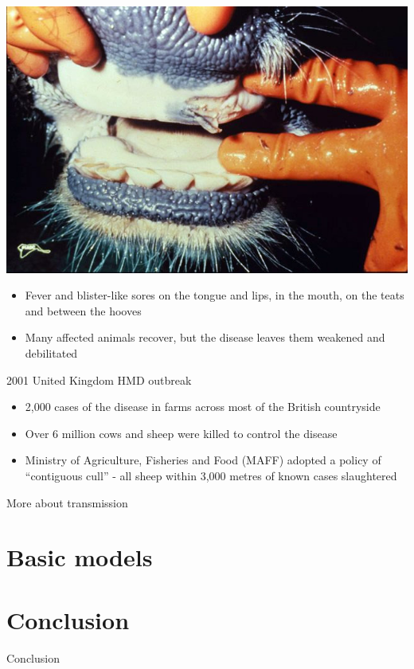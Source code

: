 \documentclass[aspectratio=43]{beamer}
\begin{document}
\begin{frame}{}
  \begin{minipage}{0.3\textwidth}
    \includegraphics[width=1.1\textwidth]{../FIGS/Foot_and_mouth_disease_in_mouth.jpg}
  \end{minipage}
  \begin{minipage}{0.65\textwidth}
    \begin{itemize}
      \item Fever and blister-like sores on the tongue and lips, in the mouth, on the teats and between the hooves
      \item Many affected animals recover, but the disease leaves them weakened and debilitated
    \end{itemize}
  \end{minipage}
\end{frame}


\begin{frame}{2001 United Kingdom HMD outbreak}
  \begin{itemize}
    \item 2,000 cases of the disease in farms across most of the British countryside
    \vfill
    \item Over 6 million cows and sheep were killed to control the disease
    \vfill
    \item Ministry of Agriculture, Fisheries and Food (MAFF) adopted a policy of ``contiguous cull'' - all sheep within 3,000 metres of known cases slaughtered
  \end{itemize}
\end{frame}

\begin{frame}{More about transmission}

\end{frame}



\section{Basic models}


\section{Conclusion}

\begin{frame}{Conclusion}
\end{frame}
\end{document}
